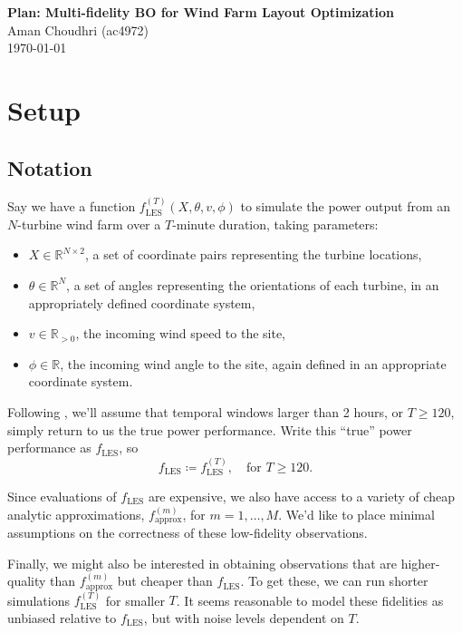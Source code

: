 \documentclass[12pt]{article}
\begin{document}
\begin{flushleft}
\textbf{Plan: Multi-fidelity BO for Wind Farm Layout Optimization} \\
Aman Choudhri (ac4972) \\
\today
\end{flushleft}


\section{Setup}
\subsection{Notation}
Say we have a function $f_\text{LES}^{(T)} (X, \theta, v, \phi)$ to simulate
the power output from an $N$-turbine wind farm over a $T$-minute duration,
taking parameters:
\begin{itemize}
    \item $X \in \mathbb{R}^{N \times 2}$, a set of coordinate pairs representing the turbine locations,
    \item $\theta \in \mathbb{R}^{N}$, a set of angles representing the
        orientations of each turbine, in an appropriately defined coordinate system,
    \item $v \in \mathbb{R}_{> 0}$, the incoming wind speed to the site,
    \item $\phi \in \mathbb{R}$, the incoming wind angle to the site, again defined in
        an appropriate coordinate system.
\end{itemize}

Following \cite{bempedelisDatadrivenOptimisationWind2024}, we'll assume that temporal windows
larger than 2 hours, or $T \geq 120$, simply return to us the true power performance. Write
this ``true'' power performance as $f_\text{LES}$, so
\[
    f_\text{LES} \coloneq f_\text{LES}^{(T)}, \quad \text{for \ } T \geq 120
.\]

Since evaluations of $f_\text{LES}$ are expensive, we also have access to a
variety of cheap analytic approximations, $f_{\text{approx}}^{(m)}$, for $m =
1,\ldots , M$. We'd like to place minimal assumptions on the correctness of
these low-fidelity observations.

Finally, we might also be interested in obtaining observations that are
higher-quality than $f^{(m)}_\text{approx}$ but cheaper than $f_\text{LES}$. To
get these, we can run shorter simulations $f^{(T)}_\text{LES}$ for smaller $T$.
It seems reasonable to model these fidelities as unbiased relative to
$f_\text{LES}$, but with noise levels dependent on $T$.
\end{document}
